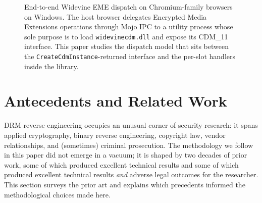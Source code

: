 \documentclass[11pt,letterpaper]{article}
\let\oldsection\section
\renewcommand{\section}{\clearpage\oldsection}
\begin{document}
\begin{figure}[t]
\centering
{}
\caption{End-to-end Widevine EME dispatch on Chromium-family browsers
on Windows. The host browser delegates Encrypted Media Extensions
operations through Mojo IPC to a utility process whose sole purpose is
to load \texttt{widevinecdm.dll} and expose its CDM\_11 interface.
This paper studies the dispatch model that sits between the
\texttt{CreateCdmInstance}-returned interface and the per-slot
handlers inside the library.}
\label{fig:system-overview}
\end{figure}

\section{Antecedents and Related Work}
\label{sec:antecedents}

DRM reverse engineering occupies an unusual corner of security
research: it spans applied cryptography, binary reverse engineering,
copyright law, vendor relationships, and (sometimes) criminal
prosecution. The methodology we follow in this paper did not emerge
in a vacuum; it is shaped by two decades of prior work, some of
which produced excellent technical results and some of which
produced excellent technical results \emph{and} adverse legal
outcomes for the researcher. This section surveys the prior art and
explains which precedents informed the methodological choices made
here.
\end{document}
